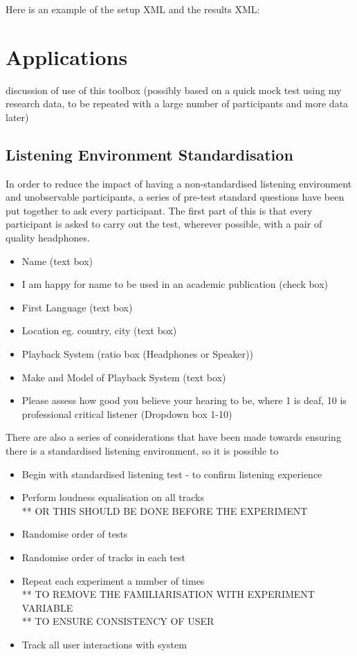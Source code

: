 \documentclass{article}
\begin{document}
Here is an example of the setup XML and the results XML:

\section{Applications}\label{sec:applications} %
discussion of use of this toolbox (possibly based on a quick mock test using my research data, to be repeated with a large number of participants and more data later)\\

\subsection{Listening Environment Standardisation}

In order to reduce the impact of having a non-standardised listening environment and unobservable participants, a series of pre-test standard questions have been put together to ask every participant. The first part of this is that every participant is asked to carry out the test, wherever possible, with a pair of quality headphones.

\begin{itemize}
\item Name (text box)
\item I am happy for name to be used in an academic publication (check box)
\item First Language (text box)
\item Location eg. country, city (text box)
\item Playback System (ratio box (Headphones or Speaker))
\item Make and Model of Playback System (text box)
\item Please assess how good you believe your hearing to be, where 1 is deaf, 10 is professional critical listener (Dropdown box 1-10)
\end{itemize}


There are also a series of considerations that have been made towards ensuring there is a standardised listening environment, so it is possible to
\begin{itemize}
\item Begin with standardised listening test - to confirm listening experience
\item Perform loudness equalisation on all tracks 
\\** OR THIS SHOULD BE DONE BEFORE THE EXPERIMENT
\item Randomise order of tests
\item Randomise order of tracks in each test
\item Repeat each experiment a number of times 
\\** TO REMOVE THE FAMILIARISATION WITH EXPERIMENT VARIABLE 
\\** TO ENSURE CONSISTENCY OF USER
\item Track all user interactions with system
\end{itemize}
\end{document}

